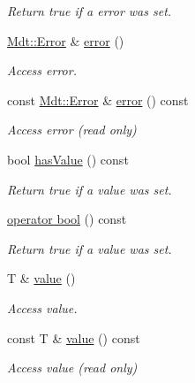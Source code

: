 \begin{DoxyCompactItemize}
\begin{DoxyCompactList}\small\item\em Return true if a error was set. \end{DoxyCompactList}\item 
\hyperlink{class_mdt_1_1_error}{Mdt\+::\+Error} \& \hyperlink{class_mdt_1_1_expected_a4e144dbc496a80e289f32f845aefcf5c}{error} ()
\begin{DoxyCompactList}\small\item\em Access error. \end{DoxyCompactList}\item 
const \hyperlink{class_mdt_1_1_error}{Mdt\+::\+Error} \& \hyperlink{class_mdt_1_1_expected_aecfcbc42443c3a2267d8d7c49e6282e8}{error} () const 
\begin{DoxyCompactList}\small\item\em Access error (read only) \end{DoxyCompactList}\item 
bool \hyperlink{class_mdt_1_1_expected_a8e75fd1c7205ad0fedac14223312c09e}{has\+Value} () const \hypertarget{class_mdt_1_1_expected_a8e75fd1c7205ad0fedac14223312c09e}{}\label{class_mdt_1_1_expected_a8e75fd1c7205ad0fedac14223312c09e}

\begin{DoxyCompactList}\small\item\em Return true if a value was set. \end{DoxyCompactList}\item 
\hyperlink{class_mdt_1_1_expected_aa88e1919edb8b192abab69bffadf660e}{operator bool} () const \hypertarget{class_mdt_1_1_expected_aa88e1919edb8b192abab69bffadf660e}{}\label{class_mdt_1_1_expected_aa88e1919edb8b192abab69bffadf660e}

\begin{DoxyCompactList}\small\item\em Return true if a value was set. \end{DoxyCompactList}\item 
T \& \hyperlink{class_mdt_1_1_expected_a744546093eb011f8d3964d749a3cbea3}{value} ()
\begin{DoxyCompactList}\small\item\em Access value. \end{DoxyCompactList}\item 
const T \& \hyperlink{class_mdt_1_1_expected_a290f2b4456b100e7066a453ffe7e94e8}{value} () const 
\begin{DoxyCompactList}\small\item\em Access value (read only) \end{DoxyCompactList}\end{DoxyCompactItemize}


